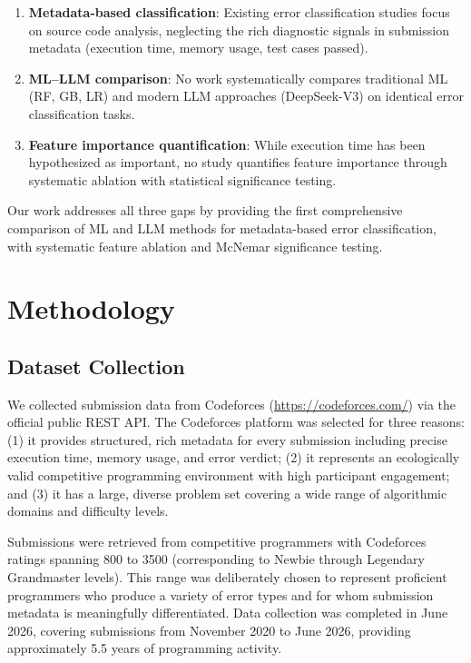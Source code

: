 \documentclass[10pt,a4paper]{article}
\begin{document}
\begin{enumerate}
    \item \textbf{Metadata-based classification}: Existing error classification
          studies focus on source code analysis, neglecting the rich diagnostic
          signals in submission metadata (execution time, memory usage, test cases
          passed).
    \item \textbf{ML--LLM comparison}: No work systematically compares traditional
          ML (RF, GB, LR) and modern LLM approaches (DeepSeek-V3)
          on identical error classification tasks.
    \item \textbf{Feature importance quantification}: While execution time has been
          hypothesized as important, no study quantifies feature importance through
          systematic ablation with statistical significance testing.
\end{enumerate}

Our work addresses all three gaps by providing the first comprehensive comparison
of ML and LLM methods for metadata-based error classification, with systematic
feature ablation and McNemar significance testing.

\section{Methodology}

\subsection{Dataset Collection}

We collected submission data from Codeforces (\url{https://codeforces.com/})
via the official public REST API. The Codeforces
platform was selected for three reasons: (1) it provides structured, rich
metadata for every submission including precise execution time, memory usage,
and error verdict; (2) it represents an ecologically valid competitive
programming environment with high participant engagement; and (3) it has a
large, diverse problem set covering a wide range of algorithmic domains and
difficulty levels.

Submissions were retrieved from competitive programmers with Codeforces
ratings spanning 800 to 3500 (corresponding to Newbie through Legendary
Grandmaster levels). This range was deliberately chosen to represent
proficient programmers who produce a variety of error types and for whom
submission metadata is meaningfully differentiated. Data collection was
completed in June 2026, covering submissions from November 2020 to June
2026, providing approximately 5.5 years of programming activity.
\end{document}
